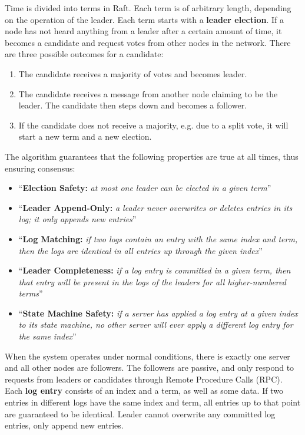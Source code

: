 Time is divided into terms in Raft. Each term is of arbitrary length, depending on the operation of the leader. Each term starts with a \textbf{leader election}. If a node has not heard anything from a leader after a certain amount of time, it becomes a candidate and request votes from other nodes in the network. There are three possible outcomes for a candidate:

\begin{enumerate}
\item The candidate receives a majority of votes and becomes leader.
\item The candidate receives a message from another node claiming to be the leader. The candidate then steps down and becomes a follower.
\item If the candidate does not receive a majority, e.g. due to a split vote, it will start a new term and a new election.
\end{enumerate}

The algorithm guarantees that the following properties are true at all times, thus ensuring consensus: 
\begin{itemize}
\item \enquote{\textbf{Election Safety:} \textit{at most one leader can be elected in a given term}}
\item \enquote{\textbf{Leader Append-Only:} \textit{a leader never overwrites or deletes entries in its log; it only appends new entries}}
\item \enquote{\textbf{Log Matching:} \textit{if two logs contain an entry with the same index and term, then the logs are identical in all entries up through the given index}}
\item \enquote{\textbf{Leader Completeness:} \textit{if a log entry is committed in a given term, then that entry will be present in the logs of the leaders for all higher-numbered terms}}
\item \enquote{\textbf{State Machine Safety:} \textit{if a server has applied a log entry at a given index to its state machine, no other server will ever apply a different log entry for the same index}}
\end{itemize}

When the system operates under normal conditions, there is exactly one server and all other nodes are followers. The followers are passive, and only respond to requests from leaders or candidates through Remote Procedure Calls (RPC). Each \textbf{log entry} consists of an index and a term, as well as some data. If two entries in different logs have the same index and term, all entries up to that point are guaranteed to be identical. Leader cannot overwrite any committed log entries, only append new entries. 

